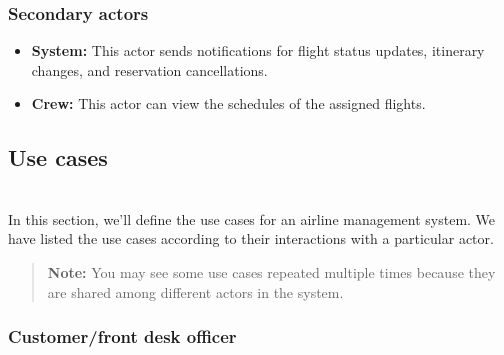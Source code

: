 \subsubsection{Secondary actors}\label{xmPU7QYiZX_pnuMgobItT}

\begin{itemize}
\item
\protect{}\label{qY9IZsLrzCmFpVmHva0yz}
\textbf{System:} This actor sends notifications for flight status updates, itinerary changes, and reservation cancellations.
\item
\protect{}\label{Dq-gqx_-Zr_ZqPz9gYqwS}
\textbf{Crew:} This actor can view the schedules of the assigned flights.
\end{itemize}

\subsection{Use cases}\label{Dmvfi3xH0sBdHCv1IkFbg}
\\
In this section, we'll define the use cases for an airline management system. We have listed the use cases according to their interactions with a particular actor.
\begin{quote}
\textbf{Note:} You may see some use cases repeated multiple times because they are shared among different actors in the system.
\end{quote}
\subsubsection{Customer/front desk officer}\label{xfqsUSFB_sL5Zygz89SFg}

